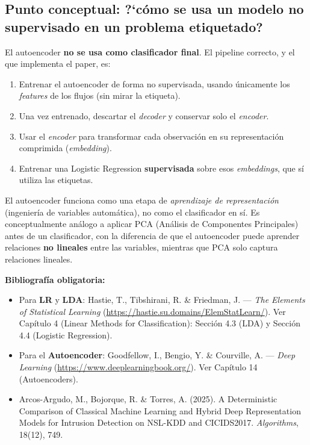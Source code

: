 \documentclass[11pt,a4paper]{article}
\begin{document}
\subsection*{Punto conceptual: ?`c\'omo se usa un modelo no supervisado en un problema etiquetado?}
El autoencoder \textbf{no se usa como clasificador final}. El pipeline correcto, y el que implementa el paper, es:
\begin{enumerate}[leftmargin=2em,itemsep=2pt]
    \item Entrenar el autoencoder de forma no supervisada, usando \'unicamente los \textit{features} de los flujos (sin mirar la etiqueta).
    \item Una vez entrenado, descartar el \textit{decoder} y conservar solo el \textit{encoder}.
    \item Usar el \textit{encoder} para transformar cada observaci\'on en su representaci\'on comprimida (\textit{embedding}).
    \item Entrenar una Logistic Regression \textbf{supervisada} sobre esos \textit{embeddings}, que s\'i utiliza las etiquetas.
\end{enumerate}
El autoencoder funciona como una etapa de \textit{aprendizaje de representaci\'on} (ingenier\'ia de variables autom\'atica), no como el clasificador en s\'i. Es conceptualmente an\'alogo a aplicar PCA (An\'alisis de Componentes Principales) antes de un clasificador, con la diferencia de que el autoencoder puede aprender relaciones \textbf{no lineales} entre las variables, mientras que PCA solo captura relaciones lineales.

\textbf{Bibliograf\'ia obligatoria:}
\begin{itemize}[leftmargin=2em,itemsep=2pt]
    \item Para \textbf{LR} y \textbf{LDA}: Hastie, T., Tibshirani, R. \& Friedman, J. --- \textit{The Elements of Statistical Learning} (\url{https://hastie.su.domains/ElemStatLearn/}). Ver Cap\'itulo 4 (Linear Methods for Classification): Secci\'on 4.3 (LDA) y Secci\'on 4.4 (Logistic Regression).
    \item Para el \textbf{Autoencoder}: Goodfellow, I., Bengio, Y. \& Courville, A. --- \textit{Deep Learning} (\url{https://www.deeplearningbook.org/}). Ver Cap\'itulo 14 (Autoencoders).
    \item Arcos-Argudo, M., Bojorque, R. \& Torres, A. (2025). A Deterministic Comparison of Classical Machine Learning and Hybrid Deep Representation Models for Intrusion Detection on NSL-KDD and CICIDS2017. \textit{Algorithms}, 18(12), 749.
\end{itemize}
\end{document}
